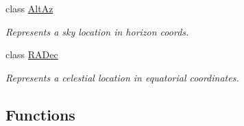 \begin{DoxyCompactItemize}
class \hyperlink{classamonpy_1_1sim_1_1sidereal_1_1_alt_az}{Alt\-Az}
\begin{DoxyCompactList}\small\item\em Represents a sky location in horizon coords. \end{DoxyCompactList}\item 
class \hyperlink{classamonpy_1_1sim_1_1sidereal_1_1_r_a_dec}{R\-A\-Dec}
\begin{DoxyCompactList}\small\item\em Represents a celestial location in equatorial coordinates. \end{DoxyCompactList}\end{DoxyCompactItemize}
\subsection*{Functions}
